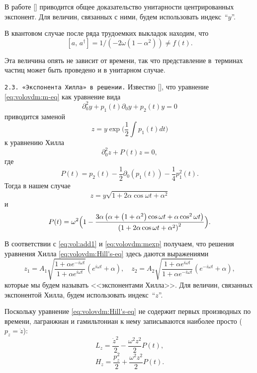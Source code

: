 В работе {[]} приводится общее доказательство унитарности
центрированных экспонент. Для величин, связанных с ними, будем использовать
индекс~``$y$''.

В квантовом случае после ряда трудоемких выкладок находим,
что
\[
\left[a,\, a^{\dagger}\right]=1/\left(-2\omega\left(1-\alpha^{2}\right)\right)\neq f(t).
\]


Эта величина опять не зависит от времени, так что представление в~терминах частиц может быть проведено и в унитарном случае.

\smallskip

\texttt{2.3. «Экспонента Хилла» в решении.}
Известно {[]}, что уравнение \eqref{eq:volovdm:m-eq}
как уравнение вида
\[
\partial_{0}^{2}y+p_{1}(t) \partial_{0}y+p_{2}(t) y=0
\]
приводится заменой $$z=y \exp\biggl(\frac{1}{2}\int p_{1}(t)dt\biggr)$$  к уравнению Хилла 
\begin{equation}
\partial_{0}^{2}z+P(t) z =0,\label{eq:volovdm:Hill's-eq}
\end{equation}
где 
\[
P(t)=p_{2}(t)-\frac{1}{2}\partial_{0}\left(p_{1}(t)\right)-\frac{1}{4}p_{1}^{2}(t).
\]
Тогда в нашем случае 
\begin{equation}
z=y\sqrt{1+2\alpha\cos\omega t+\alpha^{2}}
\label{eq:vol:add1}
\end{equation}
и 
\[
P(t)=\omega^{2}\Bigl(1-\dfrac{3\alpha\left(\alpha+\left(1+\alpha^{2}\right)\cos\omega t+\alpha\cos^{2}\omega t\right)}{\left(1+2\alpha\cos\omega t+\alpha^{2}\right)^{2}}\Bigr).
\]


В соответствии с \eqref{eq:vol:add1} и \eqref{eq:volovdm:mexp} получаем, что решения уравнения Хилла \eqref{eq:volovdm:Hill's-eq} здесь
даются выражениями 
\[
z_{1}=A_{1}\sqrt{\dfrac{1+\alpha e^{-i\omega t}}{1+\alpha e^{i\omega t}}}\left(e^{i\omega t}+\alpha\right), \quad  z_{2}=A_{2}\sqrt{\dfrac{1+\alpha e^{i\omega t}}{1+\alpha e^{-i\omega t}}}\left(e^{-i\omega t}+\alpha\right),
\]
которые мы будем называть <<экспонентами Хилла>>. 
Для величин, связанных экспонентой Хилла, будем использовать индекс~``$z$''.

Поскольку уравнение \eqref{eq:volovdm:Hill's-eq} не содержит первых производных
по времени, лагранжиан и гамильтониан к нему записываются наиболее просто ($p_{z}=\dot{z}$):
\begin{equation}
L_{z}=\frac{\dot{z}^{2}}{2}-\frac{\omega^{2}z^{2}}{2}P(t),\label{eq:volovdm:Lz}
\end{equation}
\begin{equation}
H_{z}=\frac{p_{z}^{2}}{2}+\frac{\omega^{2}z^{2}}{2}P(t).\label{eq:volovdm:Hz}
\end{equation}


